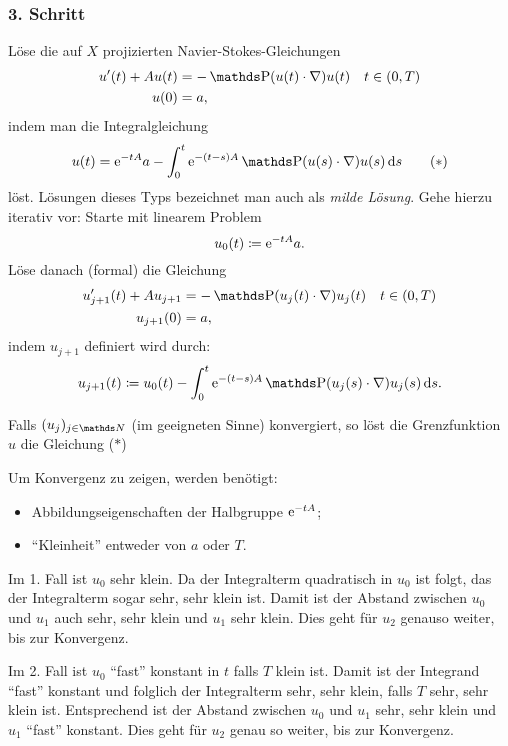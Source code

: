 \subsubsection*{3. Schritt}

Löse die auf $X$ projizierten Navier-Stokes-Gleichungen
\begin{align*}
  u'(t) + Au(t) &= -\PP(u(t) \cdot \nabla) u(t) \quad t \in (0,T) \\
  u(0) &= a,
\end{align*}
indem man die Integralgleichung
\begin{equation}
  u(t) = \e^{-tA} a - \int_0^t \e^{-(t - s)A} \PP(u(s) \cdot \nabla)u(s) \d s \tag{$\ast$}
\end{equation}
löst.
Lösungen dieses Typs bezeichnet man auch als \emph{milde Lösung}.
Gehe hierzu iterativ vor: Starte mit linearem Problem
$$
u_0(t) \coloneqq \mathrm{e}^{-tA} a.
$$
Löse danach (formal) die Gleichung
\begin{align*}
  u'_{j + 1}(t) + A u_{j + 1} &= - \PP(u_j(t) \cdot \nabla) u_j(t) \quad t \in (0,T) \\
  u_{j + 1}(0) &= a,
\end{align*}
indem $u_{j + 1}$ definiert wird durch:
$$
u_{j + 1}(t) \coloneqq u_0(t) - \int_0^t \e^{-(t - s)A} \PP(u_j(s) \cdot \nabla) u_j(s) \d s.
$$

Falls $(u_j)_{j \in \N}$ (im geeigneten Sinne) konvergiert, so löst die Grenzfunktion $u$ die Gleichung ($\ast$)

Um Konvergenz zu zeigen, werden benötigt:
\begin{itemize}
  \item Abbildungseigenschaften der Halbgruppe $\mathrm{e}^{-tA}$;
  \item ``Kleinheit'' entweder von $a$ oder $T$.
\end{itemize}

Im 1. Fall ist $u_0$ sehr klein.
Da der Integralterm quadratisch in $u_0$ ist folgt, das der Integralterm sogar sehr, sehr klein ist. 
Damit ist der Abstand zwischen $u_0$ und $u_1$ auch sehr, sehr klein und $u_1$ sehr klein. Dies geht für $u_2$ genauso weiter, bis zur Konvergenz.

Im 2. Fall ist $u_0$ ``fast'' konstant in $t$ falls $T$ klein ist. 
Damit ist der Integrand ``fast'' konstant und folglich der Integralterm sehr, sehr klein, falls $T$ sehr, sehr klein ist.
Entsprechend ist der Abstand zwischen $u_0$ und $u_1$ sehr, sehr klein und $u_1$ ``fast'' konstant.
Dies geht für $u_2$ genau so weiter, bis zur Konvergenz.
